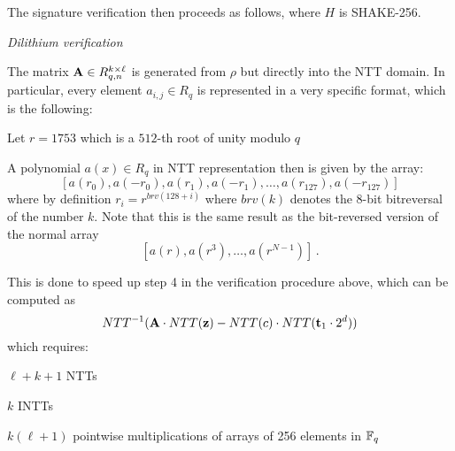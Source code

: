The signature verification then proceeds as follows, where $H$ is SHAKE-256.
\begin{algorithm}[!ht] \label{algo:dilithium_verify}
\begin{scriptsize}
\caption{\emph{Dilithium verification}}
\end{scriptsize}
\end{algorithm} 

The matrix $\mathbf{A} \in R_{q,n}^{k \times \ell}$ is generated from $\rho$ but directly into the NTT domain.
In particular, every element $a_{i,j} \in R_q$ is represented in a very specific format, which is the following:
\bit
\item Let $r = 1753$ which is a $512$-th root of unity modulo $q$
\item A polynomial $a(x) \in R_q$ in NTT representation then is given by the array:
\[ [a(r_0), a(-r_0), a(r_1), a(-r_1), \ldots, a(r_{127}), a(-r_{127})] \]
\eit
where by definition $r_i = r^{brv(128 + i)}$ where $brv(k)$ denotes the 8-bit bitreversal of the number $k$.
Note that this is the same result as the bit-reversed version of the normal array
\[  [a(r), a(r^3), \ldots, a(r^{N-1})] \, .  \]


This is done to speed up step 4 in the verification procedure above, which can be computed as 
\[ NTT^{-1} (  \mathbf{A} \cdot NTT(\mathbf{z})  - NTT(c) \cdot NTT(\mathbf{t}_1 \cdot 2^d))  \]
which requires:
\bit
\item $\ell + k + 1$ NTTs
\item $k$ INTTs
\item $k (\ell + 1)$ pointwise multiplications of arrays of 256 elements in $\mathbb{F}_q$
\eit

